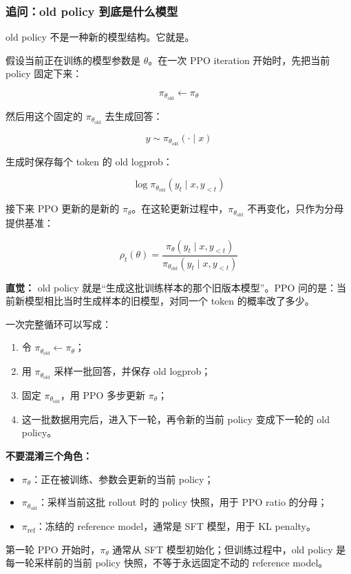 \subsubsection{追问：old policy 到底是什么模型}

old policy 不是一种新的模型结构。它就是。

假设当前正在训练的模型参数是 $\theta$。在一次 PPO iteration 开始时，先把当前 policy 固定下来：

\[
\pi_{\theta_\text{old}} \leftarrow \pi_\theta
\]

然后用这个固定的 $\pi_{\theta_\text{old}}$ 去生成回答：

\[
y \sim \pi_{\theta_\text{old}}(\cdot \mid x)
\]

生成时保存每个 token 的 old logprob：

\[
\log \pi_{\theta_\text{old}}(y_t \mid x, y_{<t})
\]

接下来 PPO 更新的是新的 $\pi_\theta$。在这轮更新过程中，$\pi_{\theta_\text{old}}$ 不再变化，只作为分母提供基准：

\[
\rho_t(\theta)
=
\frac{
\pi_\theta(y_t \mid x, y_{<t})
}{
\pi_{\theta_\text{old}}(y_t \mid x, y_{<t})
}
\]

\begin{intubox}
\textbf{直觉：} old policy 就是“生成这批训练样本的那个旧版本模型”。PPO 问的是：当前新模型相比当时生成样本的旧模型，对同一个 token 的概率改了多少。
\end{intubox}

一次完整循环可以写成：

\begin{enumerate}[leftmargin=1.5em]
  \item 令 $\pi_{\theta_\text{old}} \leftarrow \pi_\theta$；
  \item 用 $\pi_{\theta_\text{old}}$ 采样一批回答，并保存 old logprob；
  \item 固定 $\pi_{\theta_\text{old}}$，用 PPO 多步更新 $\pi_\theta$；
  \item 这一批数据用完后，进入下一轮，再令新的当前 policy 变成下一轮的 old policy。
\end{enumerate}

\begin{warnbox}
\textbf{不要混淆三个角色：}
\begin{itemize}[leftmargin=1.5em]
  \item $\pi_\theta$：正在被训练、参数会更新的当前 policy；
  \item $\pi_{\theta_\text{old}}$：采样当前这批 rollout 时的 policy 快照，用于 PPO ratio 的分母；
  \item $\pi_\text{ref}$：冻结的 reference model，通常是 SFT 模型，用于 KL penalty。
\end{itemize}
第一轮 PPO 开始时，$\pi_\theta$ 通常从 SFT 模型初始化；但训练过程中，old policy 是每一轮采样前的当前 policy 快照，不等于永远固定不动的 reference model。
\end{warnbox}

